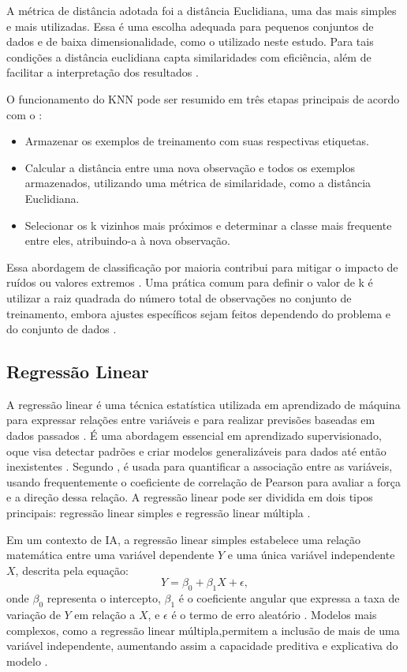 A métrica de distância adotada foi a distância Euclidiana, uma das mais simples e mais utilizadas. Essa é uma escolha adequada para pequenos conjuntos de dados e de baixa dimensionalidade, como o utilizado neste estudo. Para tais condições a distância euclidiana capta similaridades com eficiência, além de facilitar a interpretação dos resultados \cite{elkan2011}.

O funcionamento do KNN pode ser resumido em três etapas principais de acordo com o :
\begin{itemize}
    \item Armazenar os exemplos de treinamento com suas respectivas etiquetas.
    \item Calcular a distância entre uma nova observação e todos os exemplos armazenados, utilizando uma métrica de similaridade, como a distância Euclidiana.
    \item Selecionar os k vizinhos mais próximos e determinar a classe mais frequente entre eles, atribuindo-a à nova observação.
\end{itemize}

Essa abordagem de classificação por maioria contribui para mitigar o impacto de ruídos ou valores extremos \cite{elkan2011}. Uma prática comum para definir o valor de k é utilizar a raiz quadrada do número total de observações no conjunto de treinamento, embora ajustes específicos sejam feitos dependendo do problema e do conjunto de dados \cite{elkan2011}.

\subsection{Regressão Linear}

A regressão linear é uma técnica estatística utilizada em aprendizado de máquina para expressar relações entre variáveis e para realizar previsões baseadas em dados passados \cite{rodrigues}. É uma abordagem essencial em aprendizado supervisionado, oque visa detectar padrões e criar modelos generalizáveis para dados até então inexistentes \cite{soto}. Segundo ,  é usada para quantificar a associação entre as variáveis, usando frequentemente o coeficiente de correlação de Pearson para avaliar a força e a direção dessa relação. A regressão linear pode ser dividida em dois tipos principais: regressão linear simples e regressão linear múltipla \cite{soto}.

Em um contexto de IA, a regressão linear simples estabelece uma relação matemática entre uma variável dependente \( Y \) e uma única variável independente \( X \), descrita pela equação:
\[
Y = \beta_0 + \beta_1 X + \epsilon,
\]
onde \( \beta_0 \) representa o intercepto, \( \beta_1 \) é o coeficiente angular que expressa a taxa de variação de \( Y \) em relação a \( X \), e \( \epsilon \) é o termo de erro aleatório \cite{rodrigues}. Modelos mais complexos, como a regressão linear múltipla,permitem a inclusão de mais de uma variável independente, aumentando assim a capacidade preditiva e explicativa do modelo \cite{rodrigues}.


